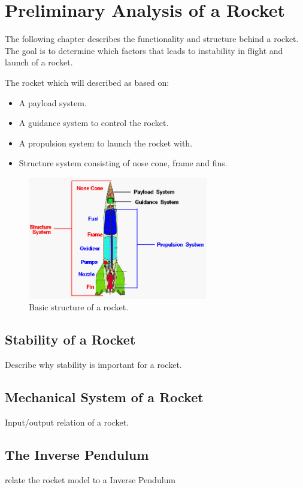 \chapter{Preliminary Analysis of a Rocket}
The following chapter describes the functionality and structure behind a rocket. The goal is to determine which factors that leads to instability in flight and launch of a rocket. 
\bigbreak

The rocket which will described as based on:
\begin{itemize}[noitemsep]
\item A payload system.
\item A guidance system to control the rocket.
\item A propulsion system to launch the rocket with. 
\item Structure system consisting of nose cone, frame and fins.
\end{itemize}    

\begin{figure}[htbp]
	\centering
 	\includegraphics[width=0.7\textwidth]{figures/RocketStructure.png} 
 	\caption{Basic structure of a rocket.}
 	\label{fig:RocketStructure}
\end{figure}


\section{Stability of a Rocket}
Describe why stability is important for a rocket. 
\section{Mechanical System of a Rocket}
Input/output relation of a rocket.
\section{The Inverse Pendulum}
relate the rocket model to a Inverse Pendulum